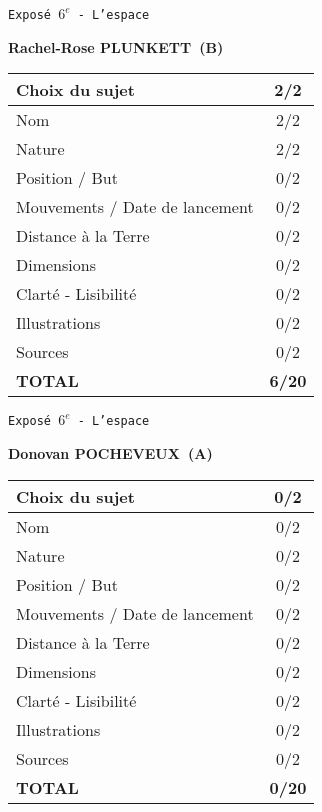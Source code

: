 	\vspace*{1cm}
	
	\newpage
	\LARGE{\texttt{Expos\'e $6^e$ - L'espace}}
	\vspace*{1cm}

	\textbf{Rachel-Rose PLUNKETT\ (B)}

	\vspace*{1.5cm}
	\begin{tabular}{|l|c|}
		\hline
		Choix du sujet & 2/2 \\
		\hline
		Nom & 2/2 \\
		\hline
		Nature & 2/2 \\
		\hline
		Position / But & 0/2 \\
		\hline
		Mouvements / Date de lancement & 0/2 \\
		\hline
		Distance \`a la Terre & 0/2 \\
		\hline
		Dimensions & 0/2 \\
		\hline
		Clart\'e - Lisibilit\'e & 0/2 \\
		\hline
		Illustrations & 0/2 \\
		\hline
		Sources & 0/2 \\
		\hline
		\textbf{TOTAL}  & \textbf{6/20} \\
		\hline
	\end{tabular}

	\vspace*{1cm}
	
	\newpage
	\LARGE{\texttt{Expos\'e $6^e$ - L'espace}}
	\vspace*{1cm}

	\textbf{Donovan POCHEVEUX\ (A)}

	\vspace*{1.5cm}
	\begin{tabular}{|l|c|}
		\hline
		Choix du sujet & 0/2 \\
		\hline
		Nom & 0/2 \\
		\hline
		Nature & 0/2 \\
		\hline
		Position / But & 0/2 \\
		\hline
		Mouvements / Date de lancement & 0/2 \\
		\hline
		Distance \`a la Terre & 0/2 \\
		\hline
		Dimensions & 0/2 \\
		\hline
		Clart\'e - Lisibilit\'e & 0/2 \\
		\hline
		Illustrations & 0/2 \\
		\hline
		Sources & 0/2 \\
		\hline
		\textbf{TOTAL}  & \textbf{0/20} \\
		\hline
	\end{tabular}

